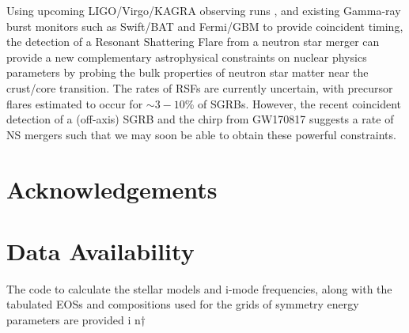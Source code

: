 \documentclass[fleqn,usenatbib]{mnras}
\begin{document}
Using upcoming LIGO/Virgo/KAGRA observing runs \citep{abbott2020prospects}, and existing Gamma-ray burst monitors such as Swift/BAT \citep{barthelmy2005burst} and Fermi/GBM \citep{meegan2009fermi} to provide coincident timing, the detection of a Resonant Shattering Flare from a neutron star merger can provide a new complementary astrophysical constraints on nuclear physics parameters by probing the bulk properties of neutron star matter near the crust/core transition. The rates of RSFs are currently uncertain, with precursor flares estimated to occur for $\sim3-10$\% of SGRBs. However, the recent coincident detection of a (off-axis) SGRB and the chirp from GW170817 suggests a rate of NS mergers such that we may soon be able to obtain these powerful constraints.  

\section*{Acknowledgements}


\section*{Data Availability}
The code to calculate the stellar models and i-mode frequencies, along with the tabulated EOSs and compositions used for the grids of symmetry energy parameters are provided i n†









%
%



\bsp	%
\label{lastpage}
\end{document}
